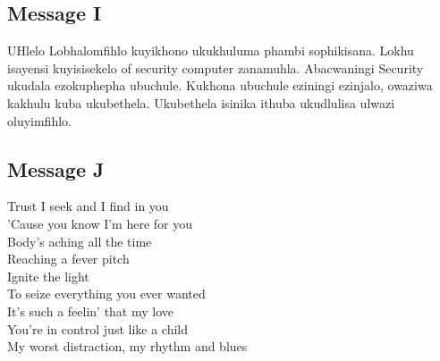 \documentclass[a4paper,10pt]{article}
\begin{document}
\begin{appendices}
\subsection{Message I}
UHlelo Lobhalomfihlo kuyikhono ukukhuluma phambi sophikisana. Lokhu isayensi kuyisisekelo of \mbox security computer zanamuhla. Abacwaningi Security ukudala ezokuphepha ubuchule. Kukhona ubuchule eziningi ezinjalo, owaziwa kakhulu kuba ukubethela. Ukubethela isinika ithuba ukudlulisa ulwazi \mbox oluyimfihlo.

\subsection{Message J}
Trust I seek and I find in you\\
'Cause you know I'm here for you\\
Body's aching all the time\\
Reaching a fever pitch\\
Ignite the light\\
To seize everything you ever wanted\\
It's such a feelin' that my love\\
You're in control just like a child\\
My worst distraction, my rhythm and blues\\


\end{appendices}

\newpage



\end{document}

